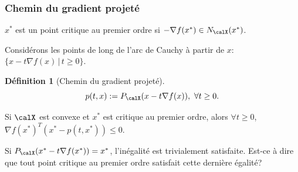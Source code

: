 \documentclass[t,aspectratio=169,usepdftitle=false]{beamer}
\newtheorem{defn}{Définition}
\def\cX{\calX}
\begin{document}
\begin{frame}
\frametitle{Chemin du gradient projeté}

$x^*$ est un point critique au premier ordre si $-\nabla f(x^*) \in N_{\cX}(x^*)$.

\mbox{}

Considérons les points de long de l'arc de Cauchy à partir de $x$:
$
\lbrace x-t\nabla f(x) \,|\, t \geq 0 \rbrace.
$

\begin{defn}[Chemin du gradient projeté]
$$
p(t,x) := P_{\cX}(x-t\nabla f(x)), \ \forall t \geq 0.
$$
\end{defn}

Si $\cX$ est convexe et $x^*$ est critique au premier ordre, alors
$\forall t \geq 0$, $
\nabla f(x^*)^T(x^*-p(t,x^*)) \leq 0.
$

\mbox{}

Si $P_{\cX}(x^*-t\nabla f(x^*)) = x^*$, l'inégalité est trivialement satisfaite. Est-ce à dire que tout point critique au premier ordre satisfait cette dernière égalité?

\end{frame}
\end{document}
